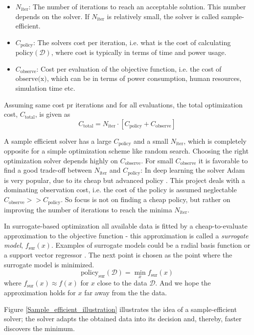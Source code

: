 \begin{itemize}[noitemsep]
    \item $N_{\text{iter}}$: The number of iterations to reach an acceptable solution. This number depends on the
    solver. If $N_{\text{iter}}$ is relatively small, the solver is called sample-efficient. 
    \item $C_{\text{policy}}$: The solvers cost per iteration, i.e. what is the cost of calculating
    $\text{policy}(\mathcal{D})$, where cost is typically in terms of time and power usage. 
    \item $C_{\text{observe}}$: Cost per evaluation of the objective function, i.e. the cost of $\text{observe(x)}$,
    which can be in terms of power consumption, human resources, simulation time etc.
\end{itemize}
Assuming same cost pr iterations and for all evaluations, the total optimization cost, $C_{\text{total}}$, is given as 
$$C_{\text{total}} = N_{\text{iter}} \cdot \left[ C_{\text{policy}} + C_{\text{observe}}\right]$$

A sample efficient solver has a large $C_{\text{policy}}$ and a small $N_{\text{iter}}$, which is
completely opposite for a simple optimization scheme like random search. Choosing the right
optimization solver depends highly on $C_{\text{observe}}$. For small $C_{\text{observe}}$ it is
favorable to find a good trade-off between $N_{\text{iter}}$ and $C_{\text{policy}}$: In deep
learning the solver Adam is very popular, due to its cheap but advanced policy \cite{Adam}. This
project deals with a dominating observation cost, i.e. the cost of the policy is assumed neglectable
$C_{\text{observe}}>>C_{\text{policy}}$. So focus is not on finding a cheap policy, but rather on
improving the number of iterations to reach the minima $N_{\text{iter}}$.

\begin{testexample}[Surrogate-based optimization]
    In surrogate-based optimization all available data is fitted by a cheap-to-evaluate
    approximation to the objective function - this approximation is called a \textit{surrogate
    model}, $f_{\text{sur}}(x)$. Examples of surrogate models could be a radial basis function or a
    support vector regressor \cite{deterministicsurrogatemodels}. The next point is chosen as the point where the surrogate model is
    minimized. 
    $$\text{policy}_{\text{sur}}(\mathcal{D}) = \min_x f_{\text{sur}}(x)$$
    where $f_{\text{sur}}(x) \approx f(x)$ for $x$ close to the data $\mathcal{D}$. And we hope the approximation
    holds for $x$ far away from the the data.
\end{testexample}
Figure \ref{Sample_efficient_illustration} illustrates the idea of a sample-efficient solver; the solver adapts
the obtained data into its decision and, thereby, faster discovers the minimum. 

